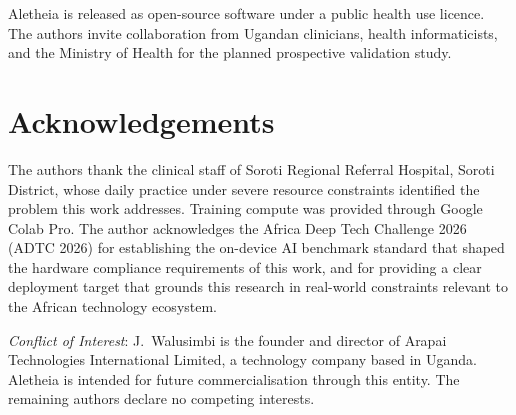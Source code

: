 \documentclass[journal]{IEEEtran}
\begin{document}
Aletheia is released as open-source software under a public
health use licence. The authors invite collaboration from Ugandan
clinicians, health informaticists, and the Ministry of Health for
the planned prospective validation study.

\section*{Acknowledgements}

The authors thank the clinical staff of Soroti Regional Referral
Hospital, Soroti District, whose daily practice under severe resource
constraints identified the problem this work addresses. Training compute was provided
through Google Colab Pro. The author acknowledges the Africa Deep
Tech Challenge 2026 (ADTC 2026) for establishing the on-device
AI benchmark standard that shaped the hardware compliance
requirements of this work, and for providing a clear deployment
target that grounds this research in real-world constraints
relevant to the African technology ecosystem.

\textit{Conflict of Interest}: J.~Walusimbi is the founder and
director of Arapai Technologies International Limited, a technology
company based in Uganda. Aletheia is intended for future
commercialisation through this entity. The remaining authors declare
no competing interests.
\end{document}
